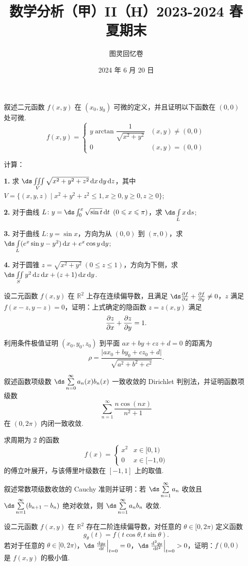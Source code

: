 \documentclass[UTF8,14pt,normal]{ctexart}
\title{\vspace{-4em}\textbf{数学分析（甲）II（H）2023-2024 春夏期末}}
\author{图灵回忆卷}
\date{2024 年 6 月 20 日}
\begin{document}
\maketitle

 叙述二元函数 $f(x, y)$ 在 $(x_0, y_0)$ 可微的定义，并且证明以下函数在 $(0, 0)$ 处可微. \[f(x, y) = \begin{cases}
    y\arctan\dfrac{1}{\sqrt{x^2 + y^2}}  & (x, y) \neq (0, 0)\\
    0                                    & (x, y) = (0, 0)
\end{cases}\]

 计算：

\textbf{1.} 求 $\ds\iiint\limits_{V}\sqrt{x^2 + y^2 + z^2}\dd{x}\dd{y}\dd{z}$，其中 $V = \{(x, y, z) \mid x^2 + y^2 + z^2 \le 1, x\geqslant 0, y\geqslant 0, z\geqslant 0\}$;

\textbf{2.} 对于曲线 $L \colon y = \ds\int_0^x\sqrt{\sin t}\dd{t}\ (0\leqslant x\leqslant \pi)$，求 $\ds\int\limits_Lx\dd{s}$;

\textbf{3.} 对于曲线 $L \colon y = \sin x$，方向为从 $(0, 0)$ 到 $(\pi, 0)$，求 $\ds\int\limits_L(e^x\sin y-y^2)\dd{x} + e^x\cos{y} \dd{y}$;

\textbf{4.} 对于圆锥 $z = \sqrt{x^2 + y^2}\ (0\leqslant z\leqslant 1)$，方向为下侧，求 $\ds\iint\limits_{S}y^2\dd{z}\dd{x} + (z + 1)\dd{x}\dd{y}$.

 设二元函数 $f(x, y)$ 在 $\mathbb{R}^2$ 上存在连续偏导数，且满足 $\ds\pdv{f}{x} + \pdv{f}{y} \neq 0$，$z$ 满足 $f(x - z, y - z) = 0$，证明：上式确定的隐函数 $z = z(x, y)$ 满足 \[\pdv{z}{x} + \pdv{z}{y} = 1.\]

 利用条件极值证明 $(x_0, y_0, z_0)$ 到平面 $ax + by + cz + d = 0$ 的距离为 \[\rho = \dfrac{\lvert ax_0 + by_0 + cz_0 + d\rvert}{\sqrt{a^2 + b^2 + c^2}}.\]

 叙述函数项级数 $\ds\sum\limits_{n=0}^{\infty} a_n(x)b_n(x)$ 一致收敛的 Dirichlet 判别法，并证明函数项级数 \[\sum_{n=1}^{\infty} \dfrac{n\cos(nx)}{n^2+1}\] 在 $(0, 2\pi)$ 内闭一致收敛.

 求周期为 $2$ 的函数 \[f(x) = \begin{cases}
    x^2   & x\in [0 , 1) \\
    0     & x\in [-1, 0)
\end{cases}\] 的傅立叶展开，与该傅里叶级数在 $[-1, 1]$ 上的取值.

 叙述常数项级数收敛的 Cauchy 准则并证明：若 $\ds\sum\limits_{n=1}^{\infty} a_n$ 收敛且 $\ds\sum\limits_{n=1}^{\infty}(b_{n+1} - b_n)$ 绝对收敛，则 $\ds\sum\limits_{n=1}^{\infty} a_nb_n$ 收敛.

 设二元函数 $f(x, y)$ 在 $\mathbb{R}^2$ 存在二阶连续偏导数，对任意的 $\theta\in [0, 2\pi)$ 定义函数 \[g_\theta(t) = f(t\cos\theta, t\sin\theta).\]
若对于任意的 $\theta\in [0, 2\pi)$，$\ds\left.\dv{g_\theta}{t}\right\vert_{t=0} = 0$，$\ds\left.\dv[2]{g_\theta}{t}\right\vert_{t=0} > 0$，证明：$f(0, 0)$ 是 $f(x, y)$ 的极小值.
\end{document}
